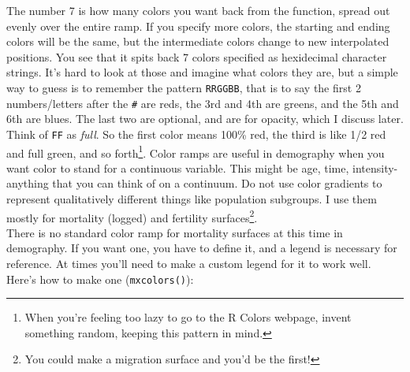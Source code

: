 \documentclass[a4paper]{article}
\begin{document}
The number 7 is how many colors you want back from the function, spread out evenly over the entire ramp. If you specify more colors, the starting and ending colors will be the same, but the intermediate colors change to new interpolated positions. You see that it spits back 7 colors specified as hexidecimal character strings. It's hard to look at those and imagine what colors they are, but a simple way to guess is to remember the pattern \texttt{RRGGBB}, that is to say the first 2 numbers/letters after the \texttt{\#} are reds, the 3rd and 4th are greens, and the 5th and 6th are blues. The last two are optional, and are for opacity, which I discuss later. Think of \texttt{FF} as \textit{full}. So the first color means 100\% red, the third is like 1/2 red and full green, and so forth\footnote{When you're feeling too lazy to go to the R Colors webpage, invent something random, keeping this pattern in mind.}. Color ramps are useful in demography when you want color to stand for a continuous variable. This might be age, time, intensity- anything that you can think of on a continuum. Do not use color gradients to represent qualitatively different things like population subgroups. I use them mostly for mortality (logged) and fertility surfaces\footnote{You could make a migration surface and you'd be the first!}.\\
 
There is no standard color ramp for mortality surfaces at this time in demography. If you want one, you have to define it, and a legend is necessary for reference. At times you'll need to make a custom legend for it to work well. Here's how to make one (\texttt{mxcolors()}):
\end{document}
